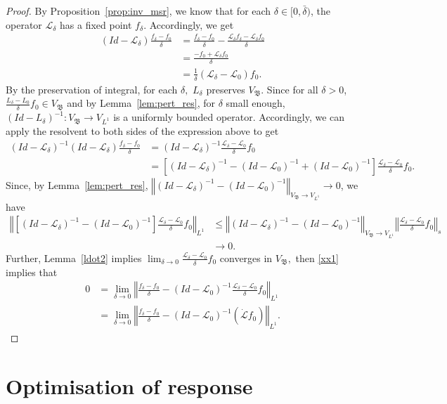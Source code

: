 \documentclass{amsart}
\newcommand\cL{{\mathcal L}}
\newcommand\fB{{\mathfrak B}}
\newcommand{\norm}[1]{\left\Vert#1\right\Vert}
\begin{document}
{
 \begin{proof}
 By Proposition~\ref{prop:inv_msr}, we know that for each \(\delta\in[0,\bar\delta)\), the operator \(\cL_\delta\) has a fixed point \(f_\delta\). Accordingly, we get
 \[
 \begin{split}
     (Id-\cL_\delta)\frac{f_\delta-f_0}{\delta}&=\frac{f_\delta-f_0}{\delta}-\frac{\cL_\delta f_\delta-\cL_\delta f_0}{\delta}\\
     &= \frac{-f_0+\cL_\delta f_0}{\delta}\\
     &= \frac{1}{\delta}(\cL_\delta-\cL_0)f_0.
 \end{split}
 \]    
 By the preservation of integral, for each $\delta ,$ $L_{\delta }$
 preserves $V_{\fB}$. Since for all $\delta >0$, $\frac{L_{\delta }-L_{0}}{\delta }f_{0}\in V_{\fB}$ and by Lemma~\ref{lem:pert_res}, for $\delta $ small enough, $(Id-L_{\delta})^{-1}:V_{\fB}\rightarrow V_{L^1}$ is a uniformly bounded operator. Accordingly, we can apply the resolvent to both sides of the expression above to get
 \begin{align}\label{xx1}
 (Id-\cL_\delta )^{-1}(Id-\cL_\delta )\frac{f_\delta -f_0}{\delta }
 &=(Id-\cL_\delta )^{-1}\frac{\cL_\delta -\cL_0}{\delta }f_{0}  
\\
 &=[(Id-\cL_{\delta })^{-1}-(Id-\cL_{0})^{-1} + (Id-\cL_{0})^{-1}]\frac{\cL_{\delta }-\cL_{0}}{\delta }f_{0}.
 \end{align}
 Since, by Lemma~\ref{lem:pert_res}, $\norm{(Id-\cL_{\delta })^{-1}-(Id-\cL_{0})^{-1}}_{V_{\fB}\rightarrow V_{L^1}}\rightarrow 0$, we have 
 \begin{align*}
 \norm{[(Id-\cL_\delta)^{-1}-(Id-\cL_0)^{-1}]\frac{\cL_\delta-\cL_0}{\delta}f_0}_{L^1} &\leq \norm{(Id-\cL_\delta)^{-1}-(Id-\cL_0)^{-1}}_{V_\fB\to V_{L^1}}\norm{\frac{\cL_\delta-\cL_0}{\delta}f_0}_s\\
 &\rightarrow 0.
 \end{align*}
 Further, Lemma~\ref{ldot2} implies $\lim_{\delta \rightarrow 0}\frac{\cL_\delta-\cL_0}{\delta }f_0$
 converges in $V_\fB,$ then \eqref{xx1} implies that
 \begin{align*}
 0&=\lim_{\delta \rightarrow 0}\norm{\frac{f_\delta-f_0}{\delta } -(Id-\cL_0)^{-1}\frac{\cL_\delta-\cL_0}{\delta }f_0}_{L^1} \\
 &=\lim_{\delta \rightarrow 0}\norm{\frac{f_\delta-f_0}{\delta }-(Id-\cL_0)^{-1}(\dot{\cL}f_0)}_{L^1}.
 \end{align*}
 \end{proof}
}

\section{Optimisation of response}\label{sec:optimal}
\end{document}
